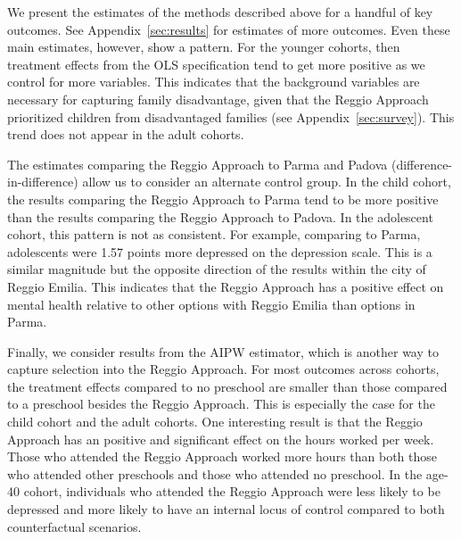We present the estimates of the methods described above for a handful of key outcomes. See Appendix~\ref{sec:results} for estimates of more outcomes. Even these main estimates, however, show a pattern. For the younger cohorts, then treatment effects from the OLS specification tend to get more positive as we control for more variables. This indicates that the background variables are necessary for capturing family disadvantage, given that the Reggio Approach prioritized children from disadvantaged families (see Appendix~\ref{sec:survey}). This trend does not appear in the adult cohorts.

The estimates comparing the Reggio Approach to Parma and Padova (difference-in-difference) allow us to consider an alternate control group. In the child cohort, the results comparing the Reggio Approach to Parma tend to be more positive than the results comparing the Reggio Approach to Padova. In the adolescent cohort, this pattern is not as consistent. For example, comparing to Parma, adolescents were 1.57 points more depressed on the depression scale. This is a similar magnitude but the opposite direction of the results within the city of Reggio Emilia. This indicates that the Reggio Approach has a positive effect on mental health relative to other options with Reggio Emilia than options in Parma.

Finally, we consider results from the AIPW estimator, which is another way to capture selection into the Reggio Approach. For most outcomes across cohorts, the treatment effects compared to no preschool are smaller than those compared to a preschool besides the Reggio Approach. This is especially the case for the child cohort and the adult cohorts. One interesting result is that the Reggio Approach has an positive and significant effect on the hours worked per week. Those who attended the Reggio Approach worked more hours than both those who attended other preschools and those who attended no preschool. In the age-40 cohort, individuals who attended the Reggio Approach were less likely to be depressed and more likely to have an internal locus of control compared to both counterfactual scenarios.



